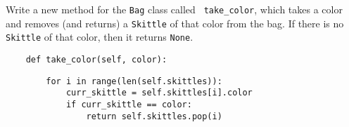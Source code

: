 \question Write a new method for the \texttt{Bag} class called {\tt
take\_color}, which takes a color and removes (and returns) a \texttt{Skittle}
of that color from the bag. If there is no \texttt{Skittle} of that color, then
it returns {\tt None}.

\begin{lstlisting}
    def take_color(self, color):
\end{lstlisting}
\begin{solution}[2 in]
\begin{lstlisting}
        for i in range(len(self.skittles)):
            curr_skittle = self.skittles[i].color
            if curr_skittle == color:
                return self.skittles.pop(i)
\end{lstlisting}
\end{solution}

